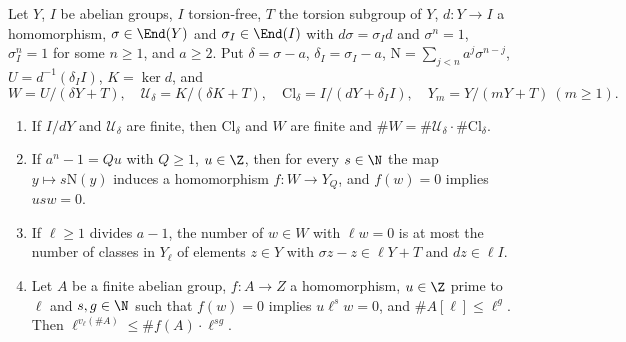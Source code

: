 \begin{lemma}\label{pf:vwin:ctalg}
Let $Y$, $I$ be abelian groups, $I$ torsion-free, $T$ the torsion subgroup of $Y$, $d:Y\to I$ a homomorphism, $\sigma\in\End(Y)$ and
$\sigma_I\in\End(I)$ with $d\sigma=\sigma_Id$ and $\sigma^n=1$, $\sigma_I^n=1$ for some $n\ge1$, and $a\ge2$. Put $\delta=\sigma-a$,
$\delta_I=\sigma_I-a$, $\mathrm N=\sum_{j<n}a^j\sigma^{n-j}$, $U=d^{-1}(\delta_II)$, $K=\ker d$, and
\[
 W=U/(\delta Y+T),\quad \mathcal U_\delta=K/(\delta K+T),\quad \mathrm{Cl}_\delta=I/(dY+\delta_II),\quad Y_m=Y/(mY+T)\ (m\ge1).
\]
\begin{enumerate}[label=(\alph*)]
\item\label{pf:vwin:ctalg-a} If $I/dY$ and $\mathcal U_\delta$ are finite, then $\mathrm{Cl}_\delta$ and $W$ are finite and
$\#W=\#\mathcal U_\delta\cdot\#\mathrm{Cl}_\delta$.
\item\label{pf:vwin:ctalg-b} If $a^n-1=Qu$ with $Q\ge1$, $u\in\Z$, then for every $s\in\N$ the map $y\mapsto s\mathrm N(y)$ induces a
homomorphism $f:W\to Y_Q$, and $f(w)=0$ implies $usw=0$.
\item\label{pf:vwin:ctalg-c} If $\ell\ge1$ divides $a-1$, the number of $w\in W$ with $\ell w=0$ is at most the number of classes in
$Y_\ell$ of elements $z\in Y$ with $\sigma z-z\in\ell Y+T$ and $dz\in\ell I$.
\item\label{pf:vwin:ctalg-d} Let $A$ be a finite abelian group, $f:A\to Z$ a homomorphism, $u\in\Z$ prime to $\ell$ and $s,g\in\N$ such
that $f(w)=0$ implies $u\ell^sw=0$, and $\#A[\ell]\le\ell^g$. Then $\ell^{v_\ell(\#A)}\le\#f(A)\cdot\ell^{sg}$.
\end{enumerate}
\end{lemma}

